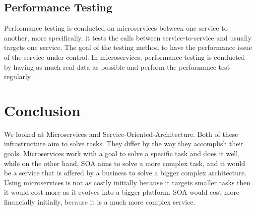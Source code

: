 \documentclass{IEEEtran}
\begin{document}
		\subsection{Performance Testing}
			Performance testing is conducted on microservices between one service to another, more specifically, it tests the calls between service-to-service and usually targets one service. The goal of the testing method to have the performance issue of the service under control. In microservices, performance testing is conducted by having as much real data as possible and perform the performance test regularly \cite{ibmred}.
			\newline

	\section{Conclusion}
		We looked at Microservices and Service-Oriented-Architecture. Both of these infrastructure aim to solve tasks. They differ by the way they accomplish their goals. Microservices work with a goal to solve a specific task and does it well, while on the other hand, SOA aims to solve a more complex task, and it would be a service that is offered by a business to solve a bigger complex architecture. Using microservices is not as costly initially because it targets smaller tasks then it would cost more as it evolves into a bigger platform. SOA would cost more financially initially, because it is a much more complex service. 



	\newpage
	
	
\end{document}
